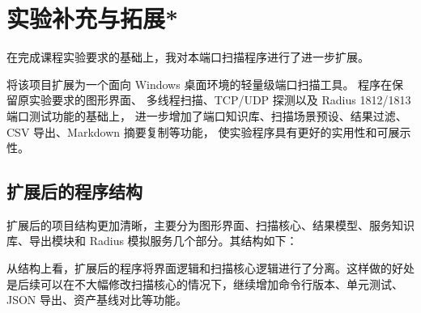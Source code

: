 \documentclass[UTF8,a4paper,12pt]{ctexart}
\begin{document}
\section{实验补充与拓展*}


在完成课程实验要求的基础上，我对本端口扫描程序进行了进一步扩展。

将该项目扩展为一个面向 Windows 桌面环境的轻量级端口扫描工具。
程序在保留原实验要求的图形界面、
多线程扫描、TCP/UDP 探测以及 Radius 1812/1813 端口测试功能的基础上，
进一步增加了端口知识库、扫描场景预设、结果过滤、CSV 导出、Markdown 摘要复制等功能，
使实验程序具有更好的实用性和可展示性。
\subsection{扩展后的程序结构}

扩展后的项目结构更加清晰，主要分为图形界面、扫描核心、结果模型、服务知识库、导出模块和 Radius 模拟服务几个部分。其结构如下：

从结构上看，扩展后的程序将界面逻辑和扫描核心逻辑进行了分离。这样做的好处是后续可以在不大幅修改扫描核心的情况下，继续增加命令行版本、单元测试、JSON 导出、资产基线对比等功能。
\end{document}
